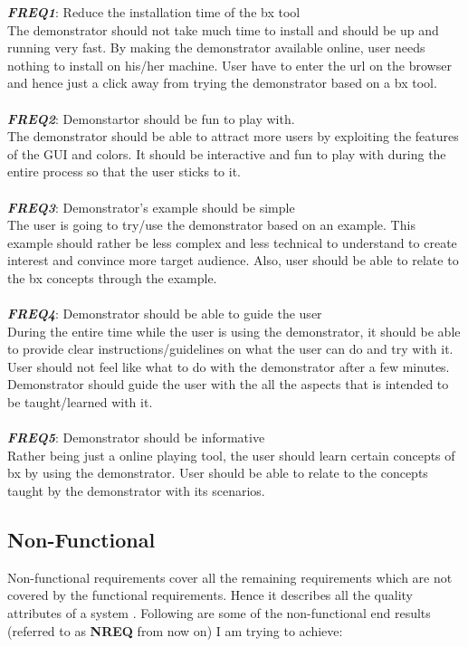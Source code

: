 \textbf{\textit{FREQ1}}: Reduce the installation time of the bx tool\\
The demonstrator should not take much time to install and should be up and running very fast. By making the demonstrator available online, user needs nothing to install on his/her machine. User have to enter the url on the browser and hence just a click away from trying the demonstrator based on a bx tool.\\\\
\textbf{\textit{FREQ2}}: Demonstartor should be fun to play with.\\
The demonstrator should be able to attract more users by exploiting the features of the GUI and colors. It should be interactive and fun to play with during the entire process so that the user sticks to it.\\\\
\textbf{\textit{FREQ3}}: Demonstrator's example should be simple\\
The user is going to try/use the demonstrator based on an example. This example should rather be less complex and less technical to understand to create interest and convince more target audience. Also, user should be able to relate to the bx concepts through the example.\\\\
\textbf{\textit{FREQ4}}: Demonstrator should be able to guide the user\\
During the entire time while the user is using the demonstrator, it should be able to provide clear instructions/guidelines on what the user can do and try with it. User should not feel like what to do with the demonstrator after a few minutes. Demonstrator should guide the user with the all the aspects that is intended to be taught/learned with it.\\\\
\textbf{\textit{FREQ5}}: Demonstrator should be informative\\
Rather being just a online playing tool, the user should learn certain concepts of bx by using the demonstrator. User should be able to relate to the concepts taught by the demonstrator with its scenarios.

\subsection{Non-Functional}\label{subsec:nonfunctionalreq}
Non-functional requirements cover all the remaining requirements which are not covered by the functional requirements. Hence it describes all the quality attributes of a system \cite{funcandnonfuncreq}.
\newline\newline Following are some of the non-functional end results (referred to as \textbf{NREQ} from now on) I am trying to achieve:

